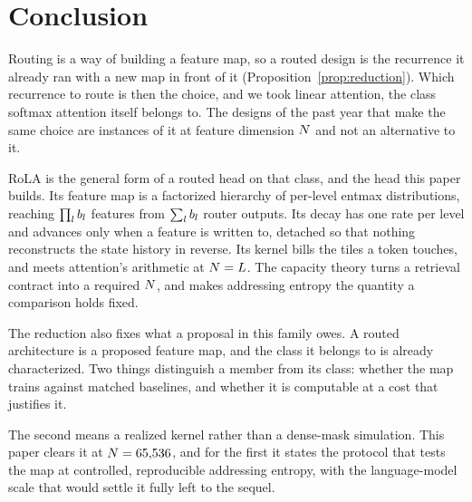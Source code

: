 %
\section{Conclusion}
\label{sec:conclusion}

Routing is a way of building a feature map, so a routed design is the recurrence it already ran with a new map in front of it (Proposition~\ref{prop:reduction}). Which recurrence to route is then the choice, and we took linear attention, the class softmax attention itself belongs to. The designs of the past year that make the same choice are instances of it at feature dimension $N$ and not an alternative to it.

RoLA is the general form of a routed head on that class, and the head this paper builds. Its feature map is a factorized hierarchy of per-level entmax distributions, reaching $\prod_l b_l$ features from $\sum_l b_l$ router outputs. Its decay has one rate per level and advances only when a feature is written to, detached so that nothing reconstructs the state history in reverse. Its kernel bills the tiles a token touches, and meets attention's arithmetic at $N = L$. The capacity theory turns a retrieval contract into a required $N$, and makes addressing entropy the quantity a comparison holds fixed.

The reduction also fixes what a proposal in this family owes. A routed architecture is a proposed feature map, and the class it belongs to is already characterized. Two things distinguish a member from its class: whether the map trains against matched baselines, and whether it is computable at a cost that justifies it.

The second means a realized kernel rather than a dense-mask simulation. This paper clears it at $N = 65{,}536$, and for the first it states the protocol that tests the map at controlled, reproducible addressing entropy, with the language-model scale that would settle it fully left to the sequel.
